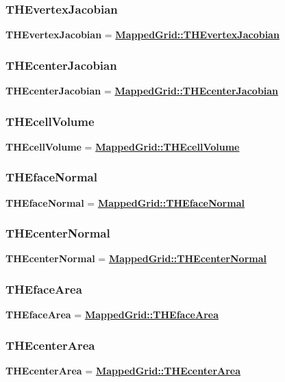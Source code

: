 \documentclass{article}
\begin{document}
  \subsubsection{THEvertexJacobian}
  \label{GridCollection::THEvertexJacobian}
    \textbf{THEvertexJacobian} =
    {\bf{}\hyperref{MappedGrid::THEvertexJacobian}{MappedGrid::THEvertexJacobian \rm(\S}{)}{MappedGrid::THEvertexJacobian}}

  \subsubsection{THEcenterJacobian}
  \label{GridCollection::THEcenterJacobian}
    \textbf{THEcenterJacobian} =
    {\bf{}\hyperref{MappedGrid::THEcenterJacobian}{MappedGrid::THEcenterJacobian \rm(\S}{)}{MappedGrid::THEcenterJacobian}}

  \subsubsection{THEcellVolume}
  \label{GridCollection::THEcellVolume}
    \textbf{THEcellVolume} =
    {\bf{}\hyperref{MappedGrid::THEcellVolume}{MappedGrid::THEcellVolume \rm(\S}{)}{MappedGrid::THEcellVolume}}

  \subsubsection{THEfaceNormal}
  \label{GridCollection::THEfaceNormal}
    \textbf{THEfaceNormal} =
    {\bf{}\hyperref{MappedGrid::THEfaceNormal}{MappedGrid::THEfaceNormal \rm(\S}{)}{MappedGrid::THEfaceNormal}}

  \subsubsection{THEcenterNormal}
  \label{GridCollection::THEcenterNormal}
    \textbf{THEcenterNormal} =
    {\bf{}\hyperref{MappedGrid::THEcenterNormal}{MappedGrid::THEcenterNormal \rm(\S}{)}{MappedGrid::THEcenterNormal}}

  \subsubsection{THEfaceArea}
  \label{GridCollection::THEfaceArea}
    \textbf{THEfaceArea} =
    {\bf{}\hyperref{MappedGrid::THEfaceArea}{MappedGrid::THEfaceArea \rm(\S}{)}{MappedGrid::THEfaceArea}}

  \subsubsection{THEcenterArea}
  \label{GridCollection::THEcenterArea}
    \textbf{THEcenterArea} =
    {\bf{}\hyperref{MappedGrid::THEcenterArea}{MappedGrid::THEcenterArea \rm(\S}{)}{MappedGrid::THEcenterArea}}
\end{document}
